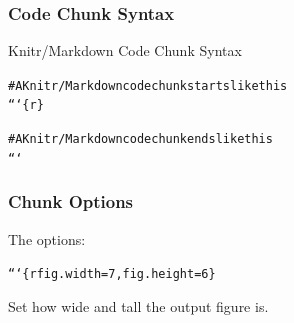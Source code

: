 \documentclass{beamer}\usepackage{graphicx, color}
\makeatletter
\newcommand{\hlcomment}[1]{\textcolor[rgb]{0.180392156862745,0.6,0.341176470588235}{#1}}%
\newenvironment{kframe}{%
 \def\at@end@of@kframe{}%
 \ifinner\ifhmode%
  \def\at@end@of@kframe{\end{minipage}}%
  \begin{minipage}{\columnwidth}%
 \fi\fi%
 \def\FrameCommand##1{\hskip\@totalleftmargin \hskip-\fboxsep
 \colorbox{shadecolor}{##1}\hskip-\fboxsep
     \hskip-\linewidth \hskip-\@totalleftmargin \hskip\columnwidth}%
 \MakeFramed {\advance\hsize-\width
   \@totalleftmargin\z@ \linewidth\hsize
   \@setminipage}}%
 {\par\unskip\endMakeFramed%
 \at@end@of@kframe}
\newenvironment{knitrout}{}{} %
\makeatother
\begin{document}
\begin{frame}[fragile]
  \frametitle{Code Chunk Syntax}
  {\LARGE{Knitr/Markdown Code Chunk Syntax}}
\begin{knitrout}
\color{fgcolor}\begin{kframe}
\begin{alltt}
\hlcomment{# A Knitr/Markdown code chunk starts like this}
```\{r\}
\end{alltt}
\end{kframe}
\end{knitrout}


\begin{knitrout}
\color{fgcolor}\begin{kframe}
\begin{alltt}
\hlcomment{# A Knitr/Markdown code chunk ends like this}
```
\end{alltt}
\end{kframe}
\end{knitrout}

\end{frame}



\begin{frame}[fragile]
  \frametitle{Chunk Options}
  The options:
\begin{knitrout}
\color{fgcolor}\begin{kframe}
\begin{alltt}
```\{r fig.width=7, fig.height=6\}
\end{alltt}
\end{kframe}
\end{knitrout}

  Set how wide and tall the output figure is. 
\end{frame}
\end{document}
